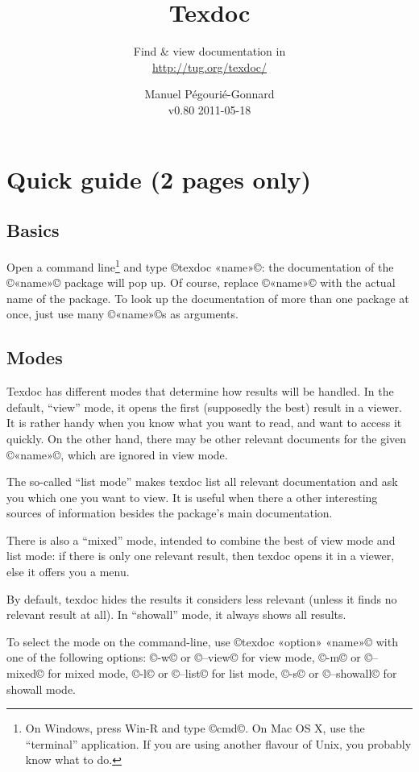 \documentclass[a4paper, oneside]{scrartcl}
\title{Texdoc}
\subtitle{Find \& view documentation in \texlive\\
  \href{http://tug.org/texdoc/}{http://tug.org/texdoc/}\\
  \mailto{texdoc@tug.org}}
\author{Manuel Pégourié-Gonnard\\
  v0.80 2011-05-18}
\date{}
\begin{document}
\VerbatimFootnotes

\maketitle

\section{Quick guide (2 pages only)}

\subsection{Basics}

Open a command line\footnote{On Windows, press Win-R and type ©cmd©.  On Mac
  OS X, use the ``terminal'' application.  If you are using another flavour of
  Unix, you probably know what to do.} and type ©texdoc «name»©: the
documentation of the ©«name»© package will pop up. Of course, replace ©«name»©
with the actual name of the package.  To look up the documentation of more
than one package at once, just use many ©«name»©s as arguments.

\subsection{Modes}\label{ss-modes}

Texdoc has different modes that determine how results will be handled. In the
default, ``view'' mode, it opens the first (supposedly the best) result in a
viewer. It is rather handy when you know what you want to read, and want to
access it quickly. On the other hand, there may be other relevant documents
for the given ©«name»©, which are ignored in view mode.

The so-called ``list mode'' makes texdoc list all relevant documentation and
ask you which one you want to view. It is useful when there a other
interesting sources of information besides the package's main documentation.

There is also a ``mixed'' mode, intended to combine the best of view mode and
list mode: if there is only one relevant result, then texdoc opens it in a
viewer, else it offers you a menu.

By default, texdoc hides the results it considers less relevant (unless it
finds no relevant result at all). In ``showall'' mode, it always shows all
results.

To select the mode on the command-line, use ©texdoc «option» «name»© with one
of the following options: ©-w© or ©--view© for view mode, ©-m© or ©--mixed©
for mixed mode, ©-l© or ©--list© for list mode, ©-s© or ©--showall© for
showall mode.
\end{document}
